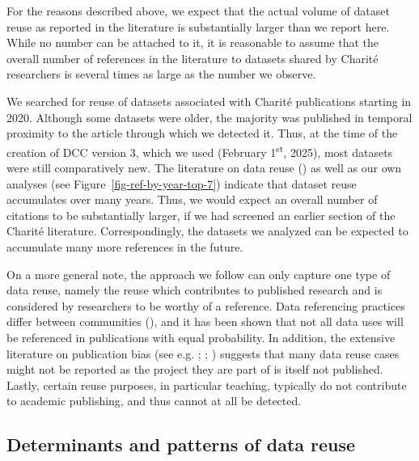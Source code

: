 \documentclass[
  letterpaper,
  DIV=11,
  numbers=noendperiod]{scrartcl}
\begin{document}
For the reasons described above, we expect that the actual volume of
dataset reuse as reported in the literature is substantially larger than
we report here. While no number can be attached to it, it is reasonable
to assume that the overall number of references in the literature to
datasets shared by Charité researchers is several times as large as the
number we observe.

We searched for reuse of datasets associated with Charité publications
starting in 2020. Although some datasets were older, the majority was
published in temporal proximity to the article through which we detected
it. Thus, at the time of the creation of DCC version 3, which we used
(February 1\textsuperscript{st}, 2025), most datasets were still
comparatively new. The literature on data reuse
() as well as our own analyses (see
Figure~\ref{fig-ref-by-year-top-7}) indicate that dataset reuse
accumulates over many years. Thus, we would expect an overall number of
citations to be substantially larger, if we had screened an earlier
section of the Charité literature. Correspondingly, the datasets we
analyzed can be expected to accumulate many more references in the
future.

On a more general note, the approach we follow can only capture one type
of data reuse, namely the reuse which contributes to published research
and is considered by researchers to be worthy of a reference. Data
referencing practices differ between communities
(), and it has been shown
that not all data uses will be referenced in publications with equal
probability. In addition, the extensive literature on publication bias
(see e.g. ;
;
) suggests that many data reuse cases might not be reported as the
project they are part of is itself not published. Lastly, certain reuse
purposes, in particular teaching, typically do not contribute to
academic publishing, and thus cannot at all be detected.

\subsection{Determinants and patterns of data
reuse}\label{sec-discussion-determinants}
\end{document}
